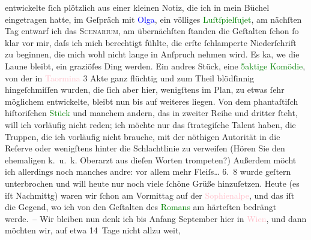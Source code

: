                entwickelte ſich plötzlich aus einer kleinen Notiz, die ich in mein Büchel
               eingetragen hatte, im Geſpräch mit \textcolor{blue}{Olga}{}\ledrightnote{\textcolor{blue}{Olga Schnitzler}}, ein
               völliges \textcolor{green}{Luſtſpielſujet}{}, am
               nächſten Tag ent{\pb}warf ich das \textsc{Scenarium}, am übernächſten ſtanden die Geſtalten ſchon ſo klar vor mir, daſs
               ich mich berechtigt fühlte, die erſte ſchlamperte Niederſchrift zu beginnen, die mich
               wohl nicht lange in Anſpruch nehmen wird. Es ka{\geminationn}, we{\geminationn} die Laune bleibt, ein graziöſes Ding werden. Ein
               andres Stück, eine \textcolor{green}{5aktige
                  Komödie}{}, von der in \textcolor{pink}{Taormina}{}\ledrightnote{\textcolor{pink}{Taormina}} 3 Akte ganz
               flüchtig und zum Theil blödſinnig hingeſchmiſſen wurden, die ſich aber hier,
               wenigſtens im Plan, zu etwas ſehr möglichem entwickelte, {\pb}bleibt nun bis auf weiteres liegen. Von dem phantaſtiſch hiſtoriſchen \textcolor{green}{Stück}{} und manchem andern, das in
               zweiter Reihe und dritter ſteht, will ich vorläufig nicht reden; ich möchte nur das
               ſtrategiſche Talent haben, die Truppen, die ich vorläufig nicht brauche, mit der
               nöthigen Autorität in die Reſerve oder wenigſtens hinter die Schlachtlinie zu
               verweiſen (Hören Sie den ehemaligen k. u. k. Oberarzt aus dieſen Worten trompeten?)
               Außerdem {\pb}möcht ich allerdings noch manches andre: vor
               allem mehr Fleiſs{\dots}\pend
           \pstart
           \raggedleft{}6. 8\pend
           \pstart
           wurde geſtern unterbrochen und will heute nur noch viele ſchöne Grüße hinzuſetzen.
               Heute (es iſt Nachmittg) waren wir ſchon am Vormittag auf
               der \textcolor{pink}{Sophienalpe}{}\ledrightnote{\textcolor{pink}{Sophienalpe}}, und das iſt die Gegend, wo ich von
               den Geſtalten des \textcolor{green}{Romans}{} am
               härteſten bedrängt werde. –\pend
           \pstart
           Wir bleiben nun denk ich bis Anfang September hier in \textcolor{pink}{Wien}{}\ledrightnote{\textcolor{pink}{Wien}}, und dann möchten wir, auf etwa 14 Tage nicht allzu weit,
